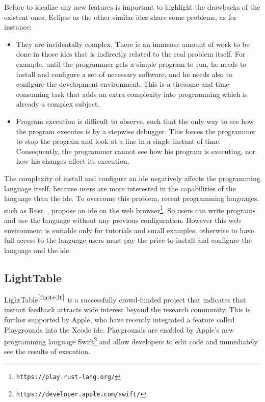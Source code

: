 Before to idealize any new features is important to highlight the drawbacks of the existent ones. Eclipse as the other similar \glspl{ide} share some problems, as for instance:

\begin{itemize}
	\item They are incidentally complex. There is an immense amount of work to be done in those \glspl{ide} that is indirectly related to the real problem itself. For example, until the programmer gets a simple program to run, he needs to install and configure a set of necessary software, and he needs also to configure the development environment. This is a tiresome and time consuming task that adds an extra complexity into programming which is already a complex subject.

	\item Program execution is difficult to observe, such that the only way to see how the program executes is by a stepwise debugger. This forces the programmer to stop the program and look at a line in a single instant of time. Consequently, the programmer cannot see how his program is executing, nor how his changes affect its execution.
\end{itemize}

The complexity of install and configure an \gls{ide} negatively affects the programming language itself, because users are more interested in the capabilities of the language than the \gls{ide}. To overcome this problem, recent programming languages, such as Rust~\citep{matsakis2014rust}, propose an \gls{ide} on the web browser\footnote{\texttt{https://play.rust-lang.org/}}. So users can write programs and use the language without any previous configuration. However this web environment is suitable only for tutorials and small examples, otherwise to have full access to the language users must pay the price to install and configure the language and the \gls{ide}.

\subsection{LightTable}
\label{subsec:lighttable}
LightTable$^{\ref{fnote:lt}}$ is a successfully crowd-funded project that indicates that instant feedback attracts wide interest beyond the research community. This is further supported by Apple, who have recently integrated a feature called Playgrounds into the Xcode \gls{ide}. Playgrounds are enabled by Apple's new programming language Swift\footnote{\texttt{https://developer.apple.com/swift/}} and allow developers to edit code and immediately see the results of execution.

